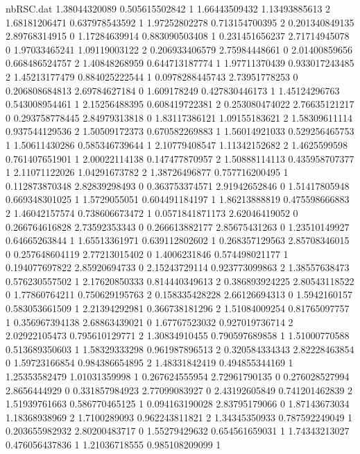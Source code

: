 \begin{filecontents}{nbRSC.dat}
1.38044320089 0.505615502842 1
1.66443509432 1.13493885613 2
1.68181206471 0.637978543592 1
1.97252802278 0.713154700395 2
0.201340849135 2.89768314915 0
1.17284639914 0.883090503408 1
0.231451656237 2.71714945078 0
1.97033465241 1.09119003122 2
0.206933406579 2.75984448661 0
2.01400859656 0.668486524757 2
1.40848268959 0.644713187774 1
1.97711370439 0.933017243485 2
1.45213177479 0.884025222544 1
0.0978288445743 2.73951778253 0
0.206808684813 2.69784627184 0
1.609178249 0.427830446173 1
1.45124296763 0.543008954461 1
2.15256488395 0.608419722381 2
0.253080474022 2.76635121217 0
0.293758778445 2.84979313818 0
1.83117386121 1.09155183621 2
1.58309611114 0.937544129536 2
1.50509172373 0.670582269883 1
1.56014921033 0.529256465753 1
1.50611430286 0.585346739644 1
2.10779408547 1.11342152682 2
1.4625599598 0.761407651901 1
2.00022114138 0.147477870957 2
1.50888114113 0.435958707377 1
2.11071122026 1.04291673782 2
1.38726496877 0.757716200495 1
0.112873870348 2.82839298493 0
0.363753374571 2.91942652846 0
1.51417805948 0.669348301025 1
1.5729055051 0.604491184197 1
1.86213888819 0.475598666883 2
1.46042157574 0.738606673472 1
0.0571841871173 2.62046419052 0
0.266764616828 2.73592353343 0
0.266613882177 2.85675431263 0
1.23510149927 0.64665263844 1
1.65513361971 0.639112802602 1
0.268357129563 2.85708346015 0
0.257648604119 2.77213015402 0
1.4006231846 0.574498021177 1
0.194077697822 2.85920694733 0
2.15243729114 0.923773099863 2
1.38557638473 0.576230557502 1
2.17620850333 0.814440349613 2
0.386893924225 2.80543118522 0
1.77860764211 0.750629195763 2
0.158335428228 2.66126694313 0
1.5942160157 0.583053661509 1
2.21394292981 0.366738181296 2
1.51084009254 0.81765097757 1
0.356967394138 2.68863439021 0
1.67767523032 0.927019736714 2
2.02922105473 0.795610129771 2
1.30834910455 0.790597689858 1
1.51000770588 0.513689350603 1
1.58329333298 0.961987896513 2
0.320584334343 2.82228463854 0
1.59723166854 0.984386654895 2
1.48331842419 0.494855344169 1
1.25353582479 1.01031359998 1
0.267624555954 2.72961790135 0
0.276028527994 2.8656444929 0
0.331857984923 2.77099083927 0
2.43192605849 0.741201462839 2
1.51939761663 0.586770465125 1
0.094163190028 2.83795179066 0
1.87143673034 1.18368938969 2
1.7100289093 0.962243811821 2
1.34345350933 0.787592249049 1
0.203655982932 2.80200483717 0
1.55279429632 0.654561659031 1
1.74343213027 0.476056437836 1
1.21036718555 0.985108209099 1
\end{filecontents}
